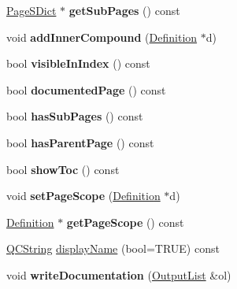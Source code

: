 \begin{DoxyCompactItemize}
\item 
\hypertarget{class_page_def_a7c6a021cacfe477303f3a9e678501983}{\hyperlink{class_page_s_dict}{Page\-S\-Dict} $\ast$ {\bfseries get\-Sub\-Pages} () const }\label{class_page_def_a7c6a021cacfe477303f3a9e678501983}

\item 
\hypertarget{class_page_def_a98509b9197b57394494196e01c70e540}{void {\bfseries add\-Inner\-Compound} (\hyperlink{class_definition}{Definition} $\ast$d)}\label{class_page_def_a98509b9197b57394494196e01c70e540}

\item 
\hypertarget{class_page_def_a46cca20bffbc8428875a7bf5396ab795}{bool {\bfseries visible\-In\-Index} () const }\label{class_page_def_a46cca20bffbc8428875a7bf5396ab795}

\item 
\hypertarget{class_page_def_af194d4a3ad2d06d391d0306d47bd7445}{bool {\bfseries documented\-Page} () const }\label{class_page_def_af194d4a3ad2d06d391d0306d47bd7445}

\item 
\hypertarget{class_page_def_a7a1e1b8d2cec05014323a333f7f534e8}{bool {\bfseries has\-Sub\-Pages} () const }\label{class_page_def_a7a1e1b8d2cec05014323a333f7f534e8}

\item 
\hypertarget{class_page_def_ab1f356bfc2f0884c3980320cc3b0e43a}{bool {\bfseries has\-Parent\-Page} () const }\label{class_page_def_ab1f356bfc2f0884c3980320cc3b0e43a}

\item 
\hypertarget{class_page_def_afeaa34dd769eb43d72a0cd75b4857290}{bool {\bfseries show\-Toc} () const }\label{class_page_def_afeaa34dd769eb43d72a0cd75b4857290}

\item 
\hypertarget{class_page_def_a8f94fa951933375021519b437bf2dd27}{void {\bfseries set\-Page\-Scope} (\hyperlink{class_definition}{Definition} $\ast$d)}\label{class_page_def_a8f94fa951933375021519b437bf2dd27}

\item 
\hypertarget{class_page_def_aaaf1df22e586c0051c2421b4b45451ed}{\hyperlink{class_definition}{Definition} $\ast$ {\bfseries get\-Page\-Scope} () const }\label{class_page_def_aaaf1df22e586c0051c2421b4b45451ed}

\item 
\hyperlink{class_q_c_string}{Q\-C\-String} \hyperlink{class_page_def_a67d09f414df966d11bbeba6298307bdf}{display\-Name} (bool=T\-R\-U\-E) const 
\item 
\hypertarget{class_page_def_a0c85f3695c99f7b1aeb762bbdabc8d62}{void {\bfseries write\-Documentation} (\hyperlink{class_output_list}{Output\-List} \&ol)}\label{class_page_def_a0c85f3695c99f7b1aeb762bbdabc8d62}

\end{DoxyCompactItemize}
